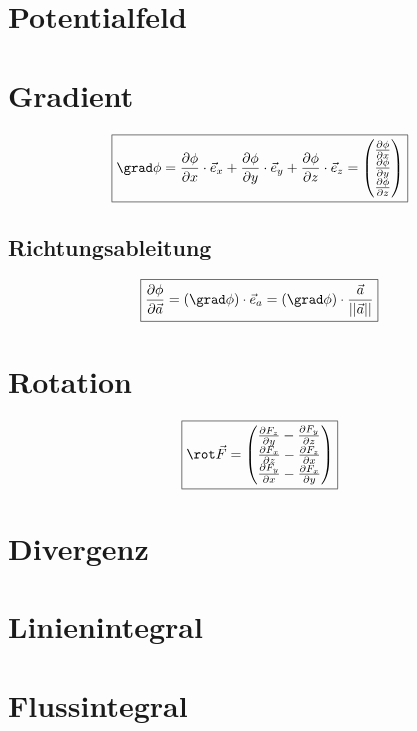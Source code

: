 \section{Potentialfeld}
\section{Gradient}
\[ \boxed{\grad \phi = \frac{\partial \phi}{\partial x} \cdot \vec{e}_x 
+ \frac{\partial \phi}{\partial y} \cdot \vec{e}_y 
+ \frac{\partial \phi}{\partial z} \cdot \vec{e}_z 
= \left(\begin{array}{@{}l@{}} 
\frac{\partial \phi}{\partial x} \\
\frac{\partial \phi}{\partial y} \\
\frac{\partial \phi}{\partial z} \\
\end{array}\right)} \]

\subsection{Richtungsableitung}
\[ \boxed{\frac{\partial \phi}{\partial \vec{a}} 
= (\grad \phi) \cdot \vec{e}_a 
= (\grad \phi) \cdot \frac{\vec{a}}{||\vec{a}||}} \]

\section{Rotation}
\[ \boxed{\rot \vec{F} = \left( \begin{array}{@{}l@{}} 
\frac{\partial F_z}{\partial y} - \frac{\partial F_y}{\partial z} \\
\frac{\partial F_x}{\partial z} - \frac{\partial F_z}{\partial x} \\
\frac{\partial F_y}{\partial x} - \frac{\partial F_x}{\partial y} \\
\end{array}\right)} \]

\section{Divergenz}
\section{Linienintegral}
\section{Flussintegral}
